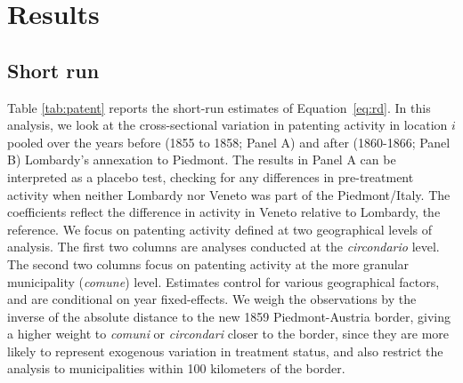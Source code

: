 

\fi

\FloatBarrier 

\section{Results}


\subsection{Short run}

\noindent Table \ref{tab:patent} reports the short-run estimates of Equation~\ref{eq:rd}. 
In this analysis, we look at the cross-sectional variation in patenting activity in location $i$ pooled over the years before (1855 to 1858; Panel A) and after (1860-1866; Panel B) Lombardy's annexation to Piedmont. 
The results in Panel A can be interpreted as a placebo test, checking for any differences in pre-treatment activity when neither Lombardy nor Veneto was part of the Piedmont/Italy. 
The coefficients reflect the difference in activity in Veneto relative to Lombardy, the reference. 
We focus on patenting activity defined at two geographical levels of analysis. 
The first two columns are analyses conducted at the \textit{circondario} level. 
The second two columns focus on patenting activity at the more granular municipality (\textit{comune}) level. 
Estimates control for various geographical factors, and are conditional on year fixed-effects.
We weigh the observations by the inverse of the absolute distance to the new 1859 Piedmont-Austria border, %
giving a higher weight to \textit{comuni} or \textit{circondari} closer to the border, since they are more likely to represent exogenous variation in treatment status, and also restrict the analysis to municipalities within 100 kilometers of the border. 


